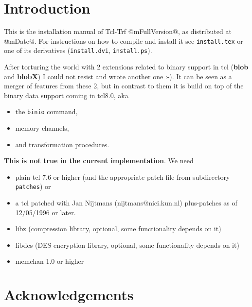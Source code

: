 \def\strong#1{{\bf #1}}
\def\lang#1{{\tt #1}}
\def\file#1{{\tt #1}}
\def\arg#1{{\tt $<$#1$>$}}
\def\trf{\strong {trf}}
\def\blob{\strong {blob}}
\def\blobx{\strong {blobX}}
\def\tcl{\lang {tcl}}
\def\cmd#1{{\tt #1}}
\def\opt#1{{\tt #1}}
\def\man#1{{\tt #1}}
\def\lib#1{{\tt #1}}
\def\url#1{{\tt #1}}

\def\version{1.0}

\tableofcontents

\chapter {Introduction}
This is the installation manual of Tcl-Trf @mFullVersion@, as distributed
at @mDate@. For instructions on how to compile and install it see \file
{install.tex} or one of its derivatives (\file {install.dvi}, \file {install.ps}).

After torturing the world with 2 extensions related to binary support
in tcl (\blob{} and \blobx{}) I could not resist and wrote another
one :-). It can be seen as a merger of features from these 2, but in
contrast to them it is build on top of the binary data support coming
in tcl8.0, aka

\begin{itemize}
\item	the \cmd{binio} command,
\item	memory channels,
\item	and transformation procedures.
\end{itemize}

\strong {This is not true in the current implementation}. We need

\begin{itemize}
\item	plain tcl 7.6 or higher (and the appropriate patch-file from
	subdirectory \file {patches}) or

\item	a tcl patched with Jan Nijtmans (nijtmans@nici.kun.nl)
	plus-patches as of 12/05/1996 or later.

\item	libz (compression library, optional, some functionality depends on it)
\item	libdes (DES encryption library, optional, some functionality depends on it)
\item	memchan 1.0 or higher
\end{itemize}


\chapter {Acknowledgements}

